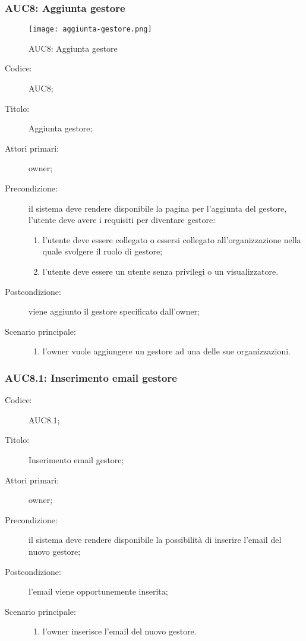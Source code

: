 \documentclass[../../../analisi-dei-requisiti.tex]{subfiles}
\begin{document}
\subsubsection{AUC8: Aggiunta gestore}%
\label{subs:AUC8}

\begin{figure}[H]
  \centering
  \texttt{[image: aggiunta-gestore.png]}
  \caption{AUC8: Aggiunta gestore}%
  \label{fig:AUC8}
\end{figure}

\begin{description}
  \item[Codice:] AUC8;
  \item[Titolo:] Aggiunta gestore;
  \item[Attori primari:] owner;
  \item[Precondizione:] il sistema deve rendere disponibile la pagina per l'aggiunta del gestore, l'utente deve avere i requisiti per diventare gestore:
  \begin{enumerate}
    \item l'utente deve essere collegato o essersi collegato all'organizzazione nella quale svolgere il ruolo di gestore;
    \item l'utente deve essere un utente senza privilegi o un visualizzatore.
  \end{enumerate}
  \item[Postcondizione:] viene aggiunto il gestore specificato dall'owner;
  \item[Scenario principale:]
  \begin{enumerate}
    \item l'owner vuole aggiungere un gestore ad una delle sue organizzazioni.
  \end{enumerate}
\end{description}

\subsubsection{AUC8.1: Inserimento email gestore}%
\label{subs:AUC8.1}
\begin{description}
  \item[Codice:] AUC8.1;
  \item[Titolo:] Inserimento email gestore;
  \item[Attori primari:] owner;
  \item[Precondizione:] il sistema deve rendere disponibile la possibilità di inserire l'email del nuovo gestore;
  \item[Postcondizione:] l'email viene opportunemente inserita;
  \item[Scenario principale:]
  \begin{enumerate}
    \item l'owner inserisce l'email del nuovo gestore.
  \end{enumerate}
\end{description}
\end{document}
